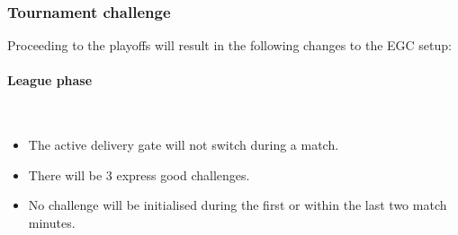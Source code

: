 \documentclass[12pt,twoside]{article}
\begin{document}
\subsubsection{Tournament challenge}
Proceeding to the playoffs will result in the following changes to the EGC setup:

\paragraph{League phase}~\\
\begin{itemize}
\item The active delivery gate will not switch during a match.
\item There will be 3 express good challenges.
\item No challenge will be initialised during the first or within the
  last two match minutes.
\end{itemize} 
\end{document}
